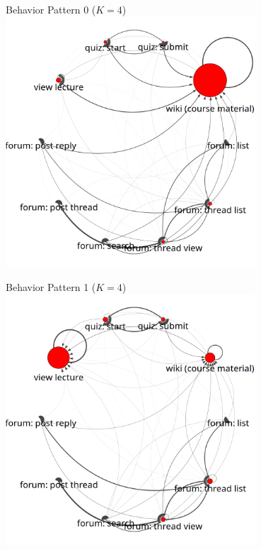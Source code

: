 \documentclass[10pt]{beamer}
\begin{document}
\begin{frame}{Behavior Pattern 0 ($K = 4$)}
  \centering
  \includegraphics[width=0.70\textwidth]{../figures/text-4state/state0.png}
\end{frame}

\begin{frame}{Behavior Pattern 1 ($K = 4$)}
  \centering
  \includegraphics[width=0.70\textwidth]{../figures/text-4state/state1.png}
\end{frame}
\end{document}
